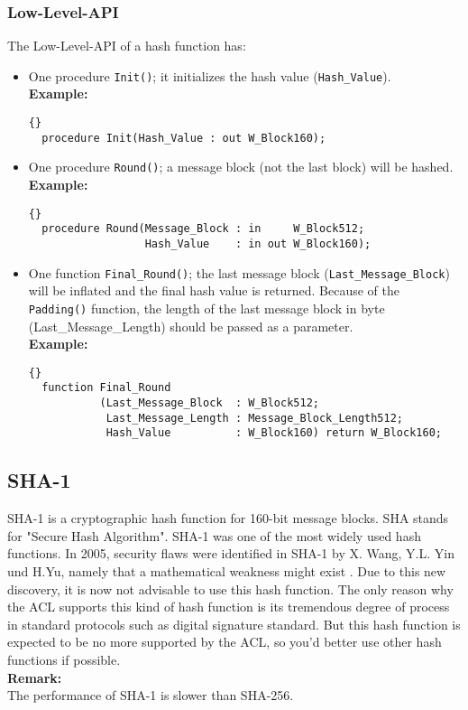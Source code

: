 \subsubsection*{Low-Level-API}
The Low-Level-API of a hash function has:
\begin{itemize} 
\item One procedure \texttt{Init()}; it initializes the hash value (\texttt{Hash\_Value}).\\
\textbf{Example:}
\begin{lstlisting}{}
  procedure Init(Hash_Value : out W_Block160);
\end{lstlisting}
\item One procedure \texttt{Round()}; a message block (not the last block) will be hashed.\\
\textbf{Example:}
\begin{lstlisting}{}
  procedure Round(Message_Block : in     W_Block512;
                  Hash_Value    : in out W_Block160);
\end{lstlisting}
\item One function \texttt{Final\_Round()}; the last message block (\texttt{Last\_Message\_Block}) will be inflated and the final hash value is returned. Because of the \texttt{Padding()} function, the length of the last message block in byte (Last\_Message\_Length) should be passed as a parameter.\\
\textbf{Example:}
\begin{lstlisting}{}
  function Final_Round
           (Last_Message_Block  : W_Block512;
            Last_Message_Length : Message_Block_Length512;
            Hash_Value          : W_Block160) return W_Block160;
\end{lstlisting}
\end{itemize}
\subsection{SHA-1}\label{SHA-1}
SHA-1 is a cryptographic hash function for 160-bit message blocks. SHA stands for "Secure Hash Algorithm". SHA-1 was one of the most widely used hash functions. In 2005, security flaws were identified in SHA-1 by X. Wang, Y.L. Yin und H.Yu, namely that a mathematical weakness might exist \cite{DBLP:conf/crypto/WangYY05a}. Due to this new discovery, it is now not advisable to use this hash function. The only reason why the ACL supports this kind of hash function is its tremendous degree of process in standard protocols such as digital signature standard. But this hash function is expected to be no more supported by the ACL, so you'd better use other hash functions if possible.  \\
\textbf{Remark:}\\
The performance of SHA-1 is slower than SHA-256.
